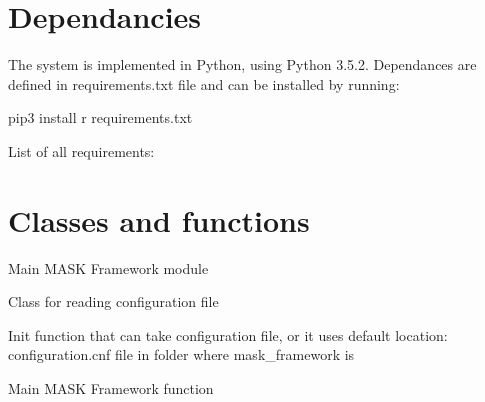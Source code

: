 \documentclass[letterpaper,10pt,english]{sphinxmanual}
\begin{document}
\chapter{Dependancies}
\label{\detokenize{index:dependancies}}
The system is implemented in Python, using Python 3.5.2. Dependances are defined in requirements.txt file and can be installed by running:

\begin{sphinxVerbatim}[commandchars=\\\{\}]
pip3 install \PYGZhy{}r requirements.txt
\end{sphinxVerbatim}

List of all requirements:

\begin{sphinxVerbatim}[commandchars=\\\{\}]
\end{sphinxVerbatim}


\chapter{Classes and functions}
\label{\detokenize{index:module-mask_framework}}\label{\detokenize{index:classes-and-functions}}
 \textendash{} Main MASK Framework module

\begin{fulllineitems}
\label{\detokenize{index:mask_framework.Configuration}}
Class for reading configuration file

Init function that can take configuration file, or it uses default location: configuration.cnf file in folder
where mask\_framework is

\end{fulllineitems}


\begin{fulllineitems}
\label{\detokenize{index:mask_framework.main}}
Main MASK Framework function

\end{fulllineitems}
\end{document}
